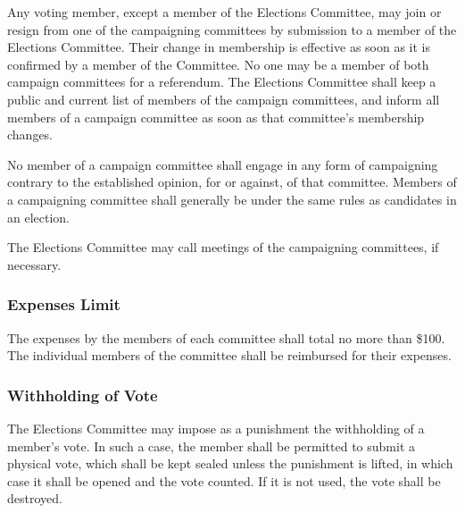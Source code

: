 Any voting member, except a member of the Elections Committee, may join or
resign from one of the campaigning committees by submission to a member of the
Elections Committee. Their change in membership is effective as soon as it is
confirmed by a member of the Committee. No one may be a member of both campaign
committees for a referendum. The Elections Committee shall keep a public and
current list of members of the campaign committees, and inform all members of a
campaign committee as soon as that committee's membership changes.

No member of a campaign committee shall engage in any form of campaigning
contrary to the established opinion, for or against, of that committee. Members
of a campaigning committee shall generally be under the same rules as candidates
in an election.

The Elections Committee may call meetings of the campaigning committees, if
necessary.

\subsubsection{Expenses Limit}
The expenses by the members of each committee shall total no more than \$100.
The individual members of the committee shall be reimbursed for their expenses.

\subsubsection{Withholding of Vote}
The Elections Committee may impose as a punishment the withholding of a member's
vote. In such a case, the member shall be permitted to submit a physical vote,
which shall be kept sealed unless the punishment is lifted, in which case it
shall be opened and the vote counted. If it is not used, the vote shall be
destroyed.
